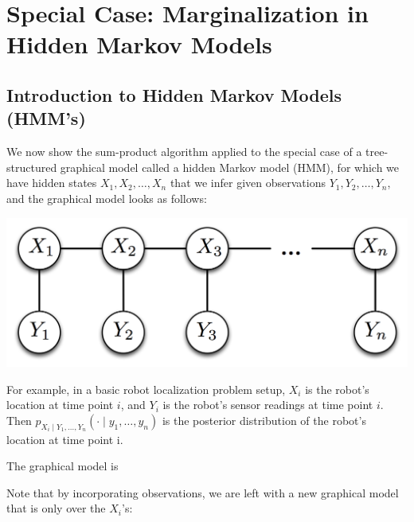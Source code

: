 \documentclass[6008notes.tex]{subfiles}
\begin{document}
\graphicspath{ {images/hiddenmarkov/} }

\section{Special Case: Marginalization in Hidden Markov Models}

\subsection{Introduction to Hidden Markov Models (HMM's)}

We now show the sum-product algorithm applied to the special case of a tree-structured graphical model called a hidden Markov model (HMM), for which we have hidden states $X_{1},X_{2},\dots ,X_{n}$ that we infer given observations $Y_{1},Y_{2},\dots ,Y_{n}$, and the graphical model looks as follows:

{\centering\includegraphics[scale=0.4]{images_sec-graphical-models-hmm} \par}

For example, in a basic robot localization problem setup, $X_i$ is the robot's location at time point $i$, and $Y_i$ is the robot's sensor readings at time point $i$. Then $p_{X_{i}\mid Y_{1},\dots ,Y_{n}}(\cdot \mid y_{1},\dots ,y_{n})$ is the posterior distribution of the robot's location at time point i.

The graphical model is

{ \par}

Note that by incorporating observations, we are left with a new graphical model that is only over the $X_i$'s:
\end{document}
